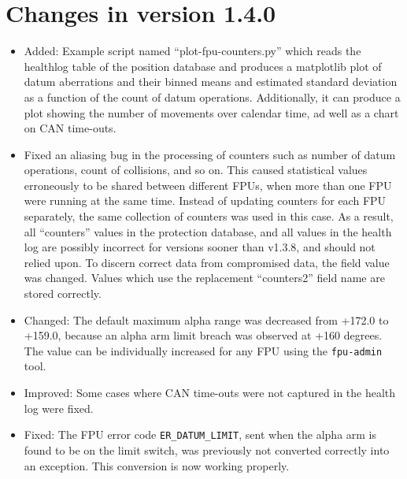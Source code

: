 \documentclass[fontsize=12,a4paper]{scrreprt}
\begin{document}
\section*{Changes in version 1.4.0}
\begin{itemize}

\item Added: Example script named ``plot-fpu-counters.py'' which reads
  the healthlog table of the position database and produces a
  matplotlib plot of datum aberrations and their binned means and
  estimated standard deviation as a function of the count of datum
  operations. Additionally, it can produce a plot showing the number
  of movements over calendar time, ad well as a chart on CAN
  time-outs.

\item Fixed an aliasing bug in the processing of counters such as
  number of datum operations, count of collisions, and so on. This
  caused statistical values erroneously to be shared between different
  FPUs, when more than one FPU were running at the same time. Instead
  of updating counters for each FPU separately, the same collection of
  counters was used in this case. As a result, all ``counters'' values
  in the protection database, and all values in the health log are
  possibly incorrect for versions sooner than v1.3.8, and should not
  relied upon.  To discern correct data from compromised data, the
  field value was changed.  Values which use the replacement
  ``counters2'' field name are stored correctly.

\item Changed: The default maximum alpha range was decreased from
  +172.0 to +159.0\degree, because an alpha arm limit breach was observed at
  +160 degrees. The value can be individually increased for any FPU
  using the \texttt{fpu-admin} tool.

\item Improved: Some cases where CAN time-outs were not captured in
  the health log were fixed.
\item Fixed: The FPU error code \texttt{ER\_DATUM\_LIMIT}, sent when
  the alpha arm is found to be on the limit switch, was previously not
  converted correctly into an exception. This conversion is now
  working properly.
\end{itemize}
\end{document}
